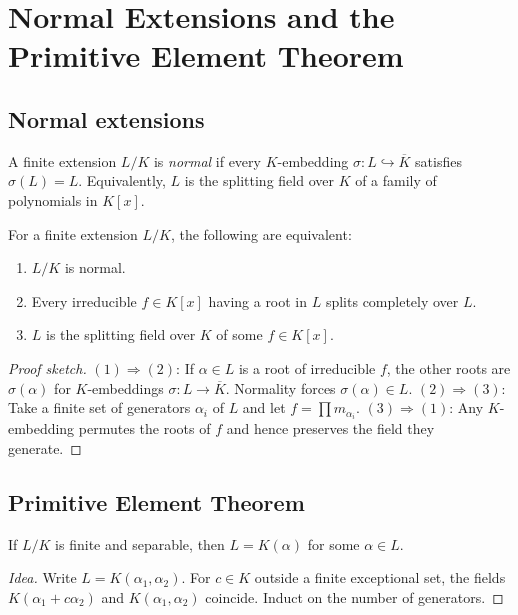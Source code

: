 \section{Normal Extensions and the Primitive Element Theorem}

\subsection{Normal extensions}

\begin{definition}[Normality]
A finite extension $L/K$ is \emph{normal} if every $K$-embedding $\sigma:L\hookrightarrow \overline{K}$ satisfies $\sigma(L)=L$. Equivalently, $L$ is the splitting field over $K$ of a family of polynomials in $K[x]$.
\end{definition}

\begin{proposition}
For a finite extension $L/K$, the following are equivalent:
\begin{enumerate}
\item $L/K$ is normal.
\item Every irreducible $f\in K[x]$ having a root in $L$ splits completely over $L$.
\item $L$ is the splitting field over $K$ of some $f\in K[x]$.
\end{enumerate}
\end{proposition}
\begin{proof}[Proof sketch]
$(1)\Rightarrow(2)$: If $\alpha\in L$ is a root of irreducible $f$, the other roots are $\sigma(\alpha)$ for $K$-embeddings $\sigma:L\to\overline{K}$. Normality forces $\sigma(\alpha)\in L$.  
$(2)\Rightarrow(3)$: Take a finite set of generators $\alpha_i$ of $L$ and let $f=\prod m_{\alpha_i}$.  
$(3)\Rightarrow(1)$: Any $K$-embedding permutes the roots of $f$ and hence preserves the field they generate.
\end{proof}

\subsection{Primitive Element Theorem}

\begin{theorem}
If $L/K$ is finite and separable, then $L=K(\alpha)$ for some $\alpha\in L$.
\end{theorem}
\begin{proof}[Idea]
Write $L=K(\alpha_1,\alpha_2)$. For $c\in K$ outside a finite exceptional set, the fields $K(\alpha_1+c\alpha_2)$ and $K(\alpha_1,\alpha_2)$ coincide. Induct on the number of generators.
\end{proof}

